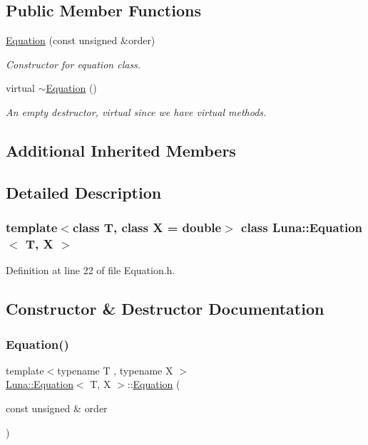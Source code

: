 \subsection*{Public Member Functions}
\begin{DoxyCompactItemize}
\item 
\hyperlink{classLuna_1_1Equation_a3331703c98854fe27f0108d75f794942}{Equation} (const unsigned \&order)
\begin{DoxyCompactList}\small\item\em Constructor for equation class. \end{DoxyCompactList}\item 
virtual \hyperlink{classLuna_1_1Equation_accb94fee3ccd30bc1075374c4b257564}{$\sim$\+Equation} ()
\begin{DoxyCompactList}\small\item\em An empty destructor, virtual since we have virtual methods. \end{DoxyCompactList}\end{DoxyCompactItemize}
\subsection*{Additional Inherited Members}


\subsection{Detailed Description}
\subsubsection*{template$<$class T, class X = double$>$\newline
class Luna\+::\+Equation$<$ T, X $>$}



Definition at line 22 of file Equation.\+h.



\subsection{Constructor \& Destructor Documentation}
\mbox{\label{classLuna_1_1Equation_a3331703c98854fe27f0108d75f794942}} 
\subsubsection{\texorpdfstring{Equation()}{Equation()}}
{\footnotesize\ttfamily template$<$typename T , typename X $>$ \\
\hyperlink{classLuna_1_1Equation}{Luna\+::\+Equation}$<$ T, X $>$\+::\hyperlink{classLuna_1_1Equation}{Equation} (\begin{DoxyParamCaption}\item[{const unsigned \&}]{order }\end{DoxyParamCaption})}



